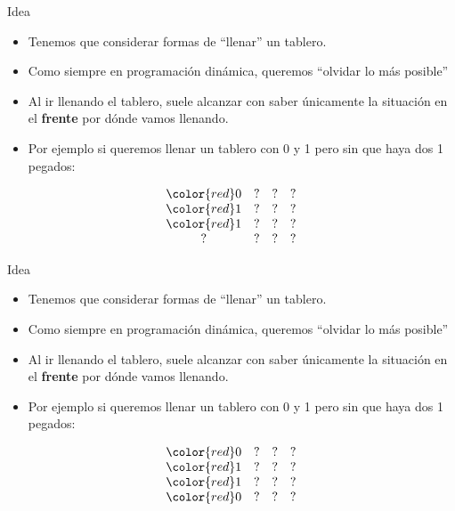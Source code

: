 \documentclass{beamer}
\begin{document}
\begin{frame}{Idea}
    \begin{itemize}
		\item Tenemos que considerar formas de ``llenar'' un tablero.
		\item Como siempre en programación dinámica, queremos ``olvidar lo más posible''
		\item Al ir llenando el tablero, suele alcanzar con saber únicamente la situación en el \textbf{frente} por dónde vamos llenando.
		\item Por ejemplo si queremos llenar un tablero con 0 y 1 pero sin que haya dos 1 pegados:
    \end{itemize}
    $$\begin{array}{cccc}
		\color{red}0 & ? & ? & ? \\
		\color{red}1 & ? & ? & ? \\
		\color{red}1 & ? & ? & ? \\
		? & ? & ? & ? \\
    \end{array}$$
\end{frame}

\begin{frame}{Idea}
    \begin{itemize}
		\item Tenemos que considerar formas de ``llenar'' un tablero.
		\item Como siempre en programación dinámica, queremos ``olvidar lo más posible''
		\item Al ir llenando el tablero, suele alcanzar con saber únicamente la situación en el \textbf{frente} por dónde vamos llenando.
		\item Por ejemplo si queremos llenar un tablero con 0 y 1 pero sin que haya dos 1 pegados:
    \end{itemize}
    $$\begin{array}{cccc}
		\color{red}0 & ? & ? & ? \\
		\color{red}1 & ? & ? & ? \\
		\color{red}1 & ? & ? & ? \\
		\color{red}0 & ? & ? & ? \\
    \end{array}$$
\end{frame}
\end{document}
